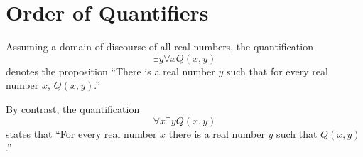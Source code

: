\section{Order of Quantifiers}

Assuming a domain of discourse of all real numbers, the quantification
\begin{equation}
  \exists y \forall x Q(x, y)
\end{equation}
denotes the proposition
``There is a real number $y$ such that for every real number $x$, $Q(x, y)$.''

By contrast, the quantification
\begin{equation}
  \forall x \exists y Q(x, y)
\end{equation}
states that
``For every real number $x$ there is a real number $y$ such that $Q(x, y)$.''

